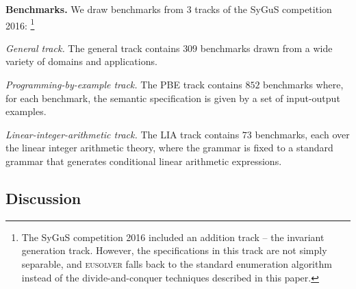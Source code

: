 \documentclass{llncs}
\newcommand{\sygus}{{\sffamily\fontsize{8.5}{10}\selectfont
    SyGuS}\xspace}
\newcommand{\dcsolve}{{\sffamily\fontsize{8.5}{10}\selectfont
    DCSolve}\xspace}
\renewcommand{\paragraph}[1]{\par\noindent\textbf{#1.}}
\newcommand{\eusolver}{\textsc{eusolver}\xspace}
\begin{document}
\paragraph{Benchmarks}
We draw benchmarks from $3$ tracks of the \sygus competition 2016:
\footnote{The \sygus competition 2016 included an addition track -- the
invariant generation track.
However, the specifications in this track are not simply separable, and
\eusolver falls back to the standard enumeration algorithm instead of
the divide-and-conquer techniques described in this paper.
}\\
\begin{inparaenum}[(a)]
\item {\em General track.} The general track contains $309$ benchmarks
  drawn from a wide variety of domains and applications.\\
\item {\em Programming-by-example track.} The PBE track contains $852$
  benchmarks where, for each benchmark, the semantic specification is
  given by a set of input-output examples.\\
\item {\em Linear-integer-arithmetic track.} The LIA track contains $73$
  benchmarks, each over the linear integer arithmetic theory, where the
  grammar is fixed to a standard grammar that generates conditional
  linear arithmetic expressions.
\end{inparaenum}


\subsection{Discussion}
\end{document}
